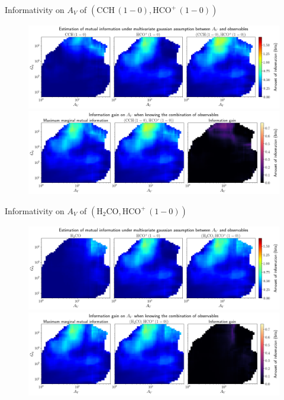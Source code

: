 \documentclass{beamer}
\begin{document}
\begin{frame}{Informativity on $A_V$ of $\left(\mathrm{CCH\,(1-0)},\mathrm{HCO^+\,(1-0)}\right)$}
    \begin{figure}
        \centering
        \includegraphics[width=0.95\linewidth]{../linearinfogauss/av__cch10_hcop10_linearinfogauss.png}
        \vfill
        \includegraphics[width=0.95\linewidth]{../linearinfogauss/av__cch10_hcop10_linearinfogauss_gain.png}
    \end{figure}
\end{frame}

\begin{frame}{Informativity on $A_V$ of $\left(\mathrm{H_2CO},\mathrm{HCO^+\,(1-0)}\right)$}
    \begin{figure}
        \centering
        \includegraphics[width=0.95\linewidth]{../linearinfogauss/av__h2co_hcop10_linearinfogauss.png}
        \vfill
        \includegraphics[width=0.95\linewidth]{../linearinfogauss/av__h2co_hcop10_linearinfogauss_gain.png}
    \end{figure}
\end{frame}
\end{document}
